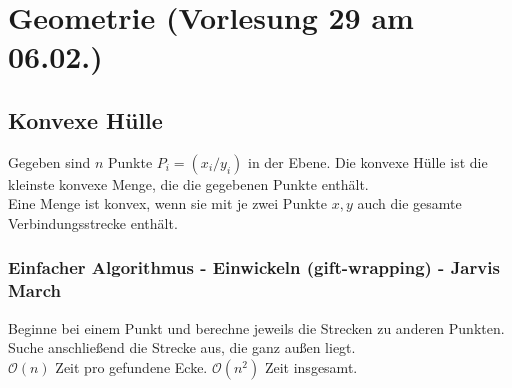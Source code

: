 \section{Geometrie \tiny (Vorlesung 29 am 06.02.)}
\subsection{Konvexe Hülle}
Gegeben sind $n$ Punkte $P_i=(x_i/y_i)$ in der Ebene. Die konvexe Hülle ist die kleinste konvexe Menge, die die gegebenen Punkte enthält.\\
Eine Menge ist konvex, wenn sie mit je zwei Punkte $x,y$ auch die gesamte Verbindungsstrecke enthält.\\
\subsubsection{Einfacher Algorithmus - Einwickeln (gift-wrapping) - Jarvis March}
Beginne bei einem Punkt und berechne jeweils die Strecken zu anderen Punkten. Suche anschließend die Strecke aus, die ganz außen liegt.\\
$\mathcal{O}(n)$ Zeit pro gefundene Ecke. $\mathcal{O}(n^2)$ Zeit insgesamt.
